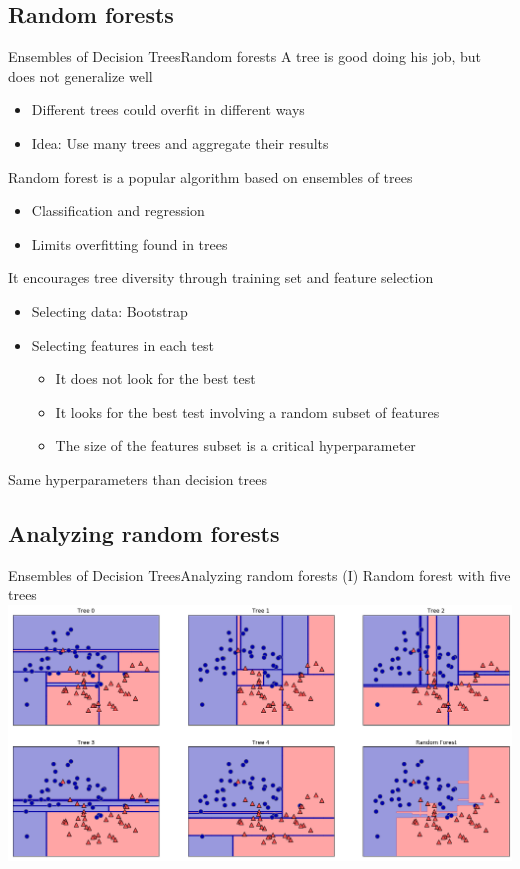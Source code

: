 \documentclass[10pt,compress]{beamer} %
\begin{document}
\subsection{Random forests}
\begin{frame}{Ensembles of Decision Trees}{Random forests}
    A tree is good doing his job, but does not generalize well
    \begin{itemize}
        \item Different trees could overfit in different ways
        \item Idea: Use many trees and aggregate their results
    \end{itemize}

    \alert{Random forest} is a popular algorithm based on ensembles of trees
    \begin{itemize}
        \item Classification and regression
        \item Limits overfitting found in trees
    \end{itemize}

    It encourages tree diversity through training set and feature selection
    \begin{itemize}
        \item Selecting data: Bootstrap
        \item Selecting features in each test
        \begin{itemize}
           \item It does not look for the best test
           \item It looks for the best test involving a random subset of features
           \item The size of the features subset is a critical hyperparameter
        \end{itemize}
    \end{itemize}
    Same hyperparameters than decision trees
\end{frame}

\subsection{Analyzing random forests}
\begin{frame}{Ensembles of Decision Trees}{Analyzing random forests (I)}
    Random forest with five trees\\
    \bigskip
    \centering \includegraphics[width=0.8\linewidth]{figs/forest.png}
\end{frame}
\end{document}
